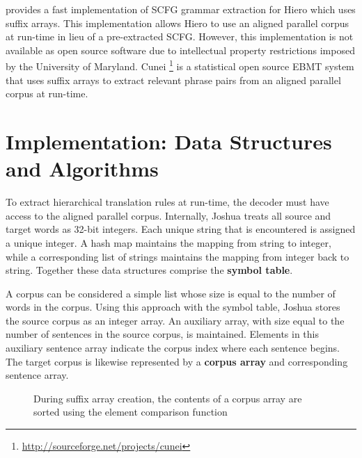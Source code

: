 \documentclass{pbml}
\newcommand{\newcite}{\namecite}
\begin{document}
\newcite{Lopez2008} provides a fast implementation of SCFG grammar extraction for Hiero which uses suffix arrays. This implementation allows Hiero to use an aligned parallel corpus at run-time in lieu of a pre-extracted SCFG. However, this implementation is not available as open source software due to intellectual property restrictions imposed by the University of Maryland. Cunei \cite{Phillips2009}\footnote{\url{http://sourceforge.net/projects/cunei}} is a statistical open source EBMT system that uses suffix arrays to extract relevant phrase pairs from an aligned parallel corpus at run-time. 


\section{Implementation: Data Structures and Algorithms}
\label{data-structures}



To extract hierarchical translation rules at run-time, the decoder must have access to the aligned parallel corpus. Internally, Joshua treats all source and target words as 32-bit integers. Each unique string that is encountered is assigned a unique integer. A hash map maintains the mapping from string to integer, while a corresponding list of strings maintains the mapping from integer back to string. Together these data structures comprise the {\bf symbol table}.

A corpus can be considered a simple list whose size is equal to the number of words in the corpus. Using this approach with the symbol table, Joshua stores the source corpus as an integer array. An auxiliary array, with size equal to the number of sentences in the source corpus, is maintained.  Elements in this auxiliary sentence array indicate the corpus index where each sentence begins. The target corpus is likewise represented by a {\bf corpus array} and corresponding sentence array.

\begin{figure}
\begin{algorithmic}[1]
			\State {}
			\State {}
			\State {}
			\State {}
		\EndIf
	\EndFor
	\State {}
\EndFunction
\end{algorithmic}
\caption{During suffix array creation, the contents of a corpus array are sorted using the element comparison function {}}
\label{sort}
\end{figure}
\end{document}
